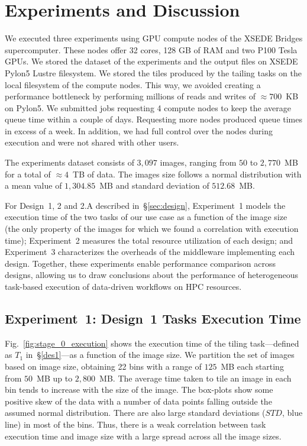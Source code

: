 \section{Experiments and Discussion}\label{sec:experiments}
We executed three experiments using GPU compute nodes of the XSEDE Bridges
supercomputer. These nodes offer 32 cores, 128 GB of RAM and two P100 Tesla
GPUs. We stored the dataset of the experiments and the output files on XSEDE
Pylon5 Lustre filesystem. We stored the tiles produced by the tailing tasks
on the local filesystem of the compute nodes. This way, we avoided creating a
performance bottleneck by performing millions of reads and writes of
$\approx700$~KB on Pylon5. We submitted jobs requesting 4 compute nodes to
keep the average queue time within a couple of days. Requesting more nodes
produced queue times in excess of a week. In addition, we had full control over 
the nodes during execution and were not shared with other users.

The experiments dataset consists of $3,097$ images, ranging from $50$ to
$2,770$~MB for a total of $\approx4$~TB of data. The images size follows a
normal distribution with a mean value of $1,304.85$~MB and standard deviation
of $512.68$~MB.


For Design~1, 2 and 2.A described in~\S\ref{sec:design}, Experiment~1 models
the execution time of the two tasks of our use case as a function of the
image size (the only property of the images for which we found a correlation
with execution time); Experiment~2 measures the total resource utilization of
each design; and Experiment~3 characterizes the overheads of the middleware
implementing each design. Together, these experiments enable performance
comparison across designs, allowing us to draw conclusions about the
performance of heterogeneous task-based execution of data-driven workflows on
HPC resources.

\subsection{Experiment~1: Design~1 Tasks Execution Time}
\label{ssec:des1analysis}


Fig.~\ref{fig:stage_0_execution} shows the execution time of the tiling
task---defined as $T_{1}$ in~\S\ref{des1}---as a function of the image size.
We partition the set of images based on image size, obtaining 22 bins with a 
range of $125$~MB each starting from $50$~MB up to $2,800$~MB. The average time 
taken to tile an image in each bin tends to increase with the size of the image. 
The box-plots show some positive skew of the data with a number of data points 
falling outside the assumed normal distribution. There are also large standard 
deviations ($STD$, blue line) in most of the bins. Thus, there is a weak 
correlation between task execution time and image size with a large spread 
across all the image sizes.



